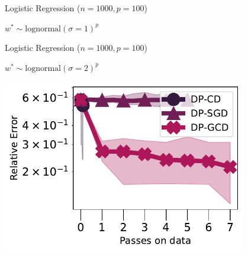 \documentclass{beamer}
\begin{document}
\begin{frame}
  \begin{center}
    Logistic Regression ($n=1000,p=100$)

    $w^* \sim \text{lognormal}(\sigma=1)^p$
  \end{center}
\end{frame}

\begin{frame}
  \begin{center}
    Logistic Regression ($n=1000,p=100$)

    $w^* \sim \text{lognormal}(\sigma=2)^p$

    \includegraphics[width=0.8\textwidth]{plots_final/lognormal_opt_2_norm.pdf}
  \end{center}
\end{frame}
\end{document}

